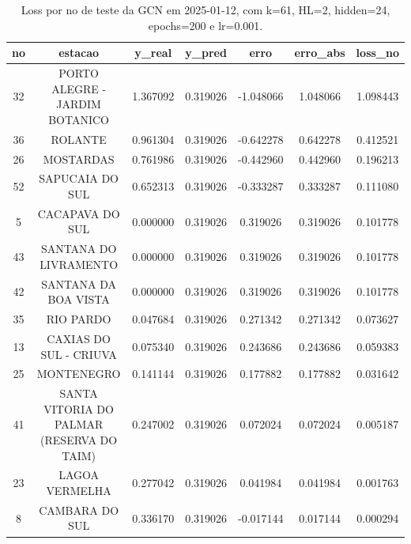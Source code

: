 \begin{table}[h]
\centering
\caption{Loss por no de teste da GCN em 2025-01-12, com k=61, HL=2, hidden=24, epochs=200 e lr=0.001.}
\label{tab:gcn_loss_k61_hl2_h24_e200_d20250112}
\begin{tabular}{ccccccc}
\toprule
no & estacao & y\_real & y\_pred & erro & erro\_abs & loss\_no \\
\midrule
32 & PORTO ALEGRE - JARDIM BOTANICO & 1.367092 & 0.319026 & -1.048066 & 1.048066 & 1.098443 \\
36 & ROLANTE & 0.961304 & 0.319026 & -0.642278 & 0.642278 & 0.412521 \\
26 & MOSTARDAS & 0.761986 & 0.319026 & -0.442960 & 0.442960 & 0.196213 \\
52 & SAPUCAIA DO SUL & 0.652313 & 0.319026 & -0.333287 & 0.333287 & 0.111080 \\
5 & CACAPAVA DO SUL & 0.000000 & 0.319026 & 0.319026 & 0.319026 & 0.101778 \\
43 & SANTANA DO LIVRAMENTO & 0.000000 & 0.319026 & 0.319026 & 0.319026 & 0.101778 \\
42 & SANTANA DA BOA VISTA & 0.000000 & 0.319026 & 0.319026 & 0.319026 & 0.101778 \\
35 & RIO PARDO & 0.047684 & 0.319026 & 0.271342 & 0.271342 & 0.073627 \\
13 & CAXIAS DO SUL - CRIUVA & 0.075340 & 0.319026 & 0.243686 & 0.243686 & 0.059383 \\
25 & MONTENEGRO & 0.141144 & 0.319026 & 0.177882 & 0.177882 & 0.031642 \\
41 & SANTA VITORIA DO PALMAR (RESERVA DO TAIM) & 0.247002 & 0.319026 & 0.072024 & 0.072024 & 0.005187 \\
23 & LAGOA VERMELHA & 0.277042 & 0.319026 & 0.041984 & 0.041984 & 0.001763 \\
8 & CAMBARA DO SUL & 0.336170 & 0.319026 & -0.017144 & 0.017144 & 0.000294 \\
\bottomrule
\end{tabular}
\end{table}
